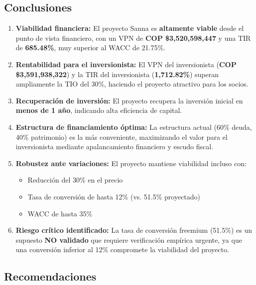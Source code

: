 \subsection{Conclusiones}

\begin{enumerate}
    \item \textbf{Viabilidad financiera:} El proyecto Sanna es \textbf{altamente viable} desde el punto de vista financiero, con un VPN de \textbf{COP \$3,520,598,447} y una TIR de \textbf{685.48\%}, muy superior al WACC de 21.75\%.
    
    \item \textbf{Rentabilidad para el inversionista:} El VPN del inversionista (\textbf{COP \$3,591,938,322}) y la TIR del inversionista (\textbf{1,712.82\%}) superan ampliamente la TIO del 30\%, haciendo el proyecto atractivo para los socios.
    
    \item \textbf{Recuperación de inversión:} El proyecto recupera la inversión inicial en \textbf{menos de 1 año}, indicando alta eficiencia de capital.
    
    \item \textbf{Estructura de financiamiento óptima:} La estructura actual (60\% deuda, 40\% patrimonio) es la más conveniente, maximizando el valor para el inversionista mediante apalancamiento financiero y escudo fiscal.
    
    \item \textbf{Robustez ante variaciones:} El proyecto mantiene viabilidad incluso con:
    \begin{itemize}
        \item Reducción del 30\% en el precio
        \item Tasa de conversión de hasta 12\% (vs. 51.5\% proyectado)
        \item WACC de hasta 35\%
    \end{itemize}
    
    \item \textbf{Riesgo crítico identificado:} La tasa de conversión freemium (51.5\%) es un supuesto \textbf{NO validado} que requiere verificación empírica urgente, ya que una conversión inferior al 12\% compromete la viabilidad del proyecto.
\end{enumerate}

\subsection{Recomendaciones}

